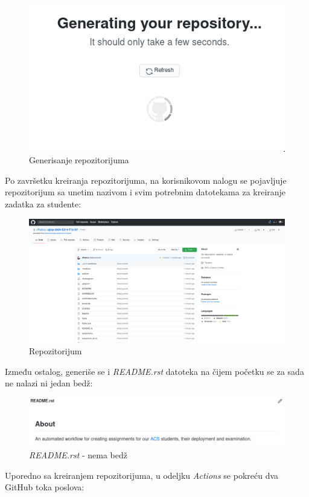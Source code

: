 \documentclass[12pt]{report}
\begin{document}
\begin{figure}[H]
    \centering
    \includegraphics[width=0.6\linewidth]{images/3.png}
    \caption{Generisanje repozitorijuma}
\end{figure}

Po završetku kreiranja repozitorijuma, na korisnikovom nalogu se pojavljuje repozitorijum sa unetim nazivom i svim potrebnim datotekama za kreiranje zadatka za studente:

\begin{figure}[H]
    \centering
    \includegraphics[width=\linewidth]{images/4.png}
    \caption{Repozitorijum}
\end{figure}

Između ostalog, generiše se i \textit{README.rst} datoteka na čijem početku se za sada ne nalazi ni jedan bedž:

\begin{figure}[H]
    \centering
    \includegraphics[width=\linewidth]{images/5.png}
    \caption{\textit{README.rst} - nema bedž}
\end{figure}

Uporedno sa kreiranjem repozitorijuma, u odeljku \textit{Actions} se pokreću dva GitHub toka poslova:
\end{document}
